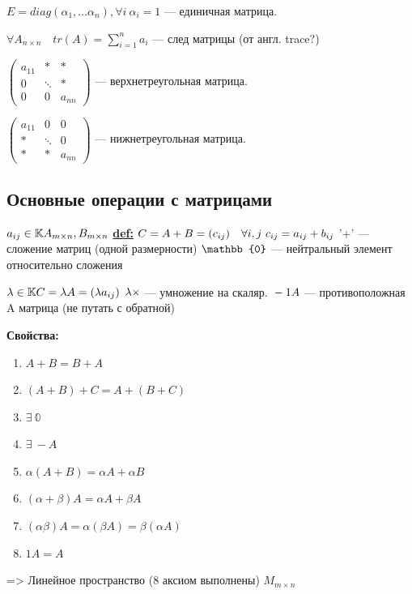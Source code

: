\documentclass[twoside]{book}
\begin{document}
\( E = diag(\alpha_1, \ldots \alpha_n), \forall i\: \alpha_i=1\) --- единичная матрица.

\( \forall A_{n \times n} \quad tr(A) = \displaystyle{\sum^{n}_{i=1}}a_i\) --- след матрицы (от англ. trace?)

\(
\begin{pmatrix}
    a_{11} & *      & *      \\
    0      & \ddots & *      \\
    0      & 0      & a_{nn}
\end{pmatrix}
\) --- верхнетреугольная матрица.

\(
\begin{pmatrix}
    a_{11} & 0      & 0      \\
    *      & \ddots & 0      \\
    *      & *      & a_{nn}
\end{pmatrix}
\) --- нижнетреугольная матрица.

\subsection{Основные операции с матрицами}
\(a_{ij} \in \mathbb{K} \newline
A_{m \times n}, B_{m \times n} \newline\)
\textbf{\underline{def:}} \( C = A + B = (c_{ij})\quad \forall i,j \  c_{ij}=a_{ij}+b_{ij} \newline\)
'+' --- сложение матриц (одной размерности)
\( \newline \mathbb{0} \) --- нейтральный элемент относительно сложения

\( \lambda \in \mathbb{K} \newline
C = \lambda A = (\lambda a_{ij})\)
$\newline \lambda \times$ --- умножение на скаляр.
\(\newline -1 A \) --- противоположная A матрица (не путать с обратной)


\textbf{Свойства:}
\begin{enumerate}
    \item $ A+B = B+A $
    \item $ (A+B)+C = A+(B+C) $
    \item $ \exists \ \mathbb{0} $
    \item $ \exists \ -A $
    \item $ \alpha(A + B) = \alpha A + \alpha B $
    \item $ (\alpha + \beta)A = \alpha A + \beta A $
    \item $ (\alpha \beta)A = \alpha( \beta A ) = \beta( \alpha A )$
    \item $ 1A = A $

\end{enumerate} => Линейное пространство (8 аксиом выполнены) $ M_{m \times n}$
\end{document}
